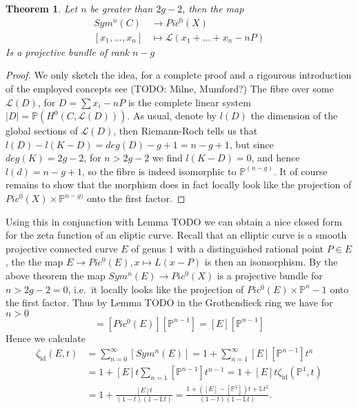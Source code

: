 \documentclass[11pt, a4paper, german]{article}
\theoremstyle{plain}
\newtheorem{theorem}{Theorem}[section]
\theoremstyle{definition}
\begin{document}
\begin{theorem}%
    Let $n$ be greater than $2g-2$, then the map 
    \begin{align*}
        Sym^n(C) &\to Pic^0(X) \\
        [x_1,\dots,x_n] &\mapsto \mathcal{L}(x_1 + \dots + x_n - nP)
    \end{align*}
    Is a projective bundle of rank $n - g$ %
\end{theorem}
\begin{proof}
    We only sketch the idea, for a complete proof and a rigourous introduction of the employed concepts see (TODO: Milne, Mumford?)
    The fibre over some $\mathcal{L}(D)$, for $D = \sum x_i - nP$ is the complete linear system $|D| = \mathbb{P}(H^0(C, \mathcal{L}(D)))$.
    As usual, denote by $l(D)$ the dimension of the global sections of $\mathcal{L}(D)$, then Riemann-Roch tells us 
    that $l(D) - l(K-D) = deg(D) - g + 1 = n - g + 1$, but since $deg(K) = 2g-2$, for $n > 2g-2$ we find $l(K-D) = 0$, and hence
    $l(d) = n-g+1$, so the fibre is indeed isomorphic to $\mathbb{P}^(n-g)$. It of course remains to show that the morphism does in
    fact locally look like the projection of $Pic^0(X) \times \mathbb{P}^{n-g)}$ onto the first factor.
\end{proof}

Using this in conjunction with Lemma TODO we can obtain a nice closed form for the zeta function of an eliptic curve.
Recall that an elliptic curve is a smooth projective connected curve $E$ of genus $1$ with a distinguished rational point $P \in E$, the
the map $E \to Pic^0(E), x \mapsto L(x-P)$ is then an isomorphism. By the above theorem the map $Sym^n(E) \to Pic^0(X)$ is a projective bundle for
$n > 2g - 2 = 0$, i.e.\ it locally looks like the projection of $Pic^0(E) \times \mathbb{P}^n-1$ onto the first factor.
Thus by Lemma TODO in the Grothendieck ring we have for $n>0$ 
\begin{equation}
    [Sym^n(E)] = [Pic^0(E)][\mathbb{P}^{n-1}] = [E][\mathbb{P}^{n-1}]
\end{equation}
Hence we calculate
\begin{align*}
    \zeta_{\mathrm{id}}(E,t) &= \sum_{n=0}^{\infty} [Sym^n(E)] = 1 + \sum_{n=1}^\infty [E][\mathbb{P}^{n-1}]t^n \\
                             &= 1 + [E]t \sum_{n=1}[\mathbb{P}^{n-1}]t^{n-1} = 1 + [E]t \zeta_{\mathrm{id}}(\mathbb{P}^1, t)\\
                             &= 1 + \frac{[E]t}{(1-t)(1-\mathbb{L}t)} = \frac{1 + ([E]-[\mathbb{P}^1])t + \mathbb{L}t^2}{(1-t)(1-\mathbb{L}t)}.
\end{align*}
\end{document}
